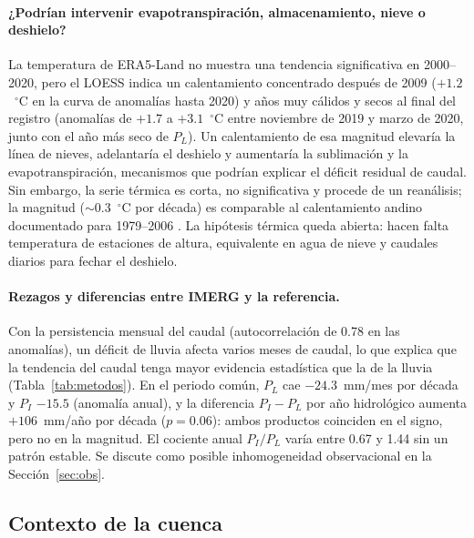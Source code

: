 \documentclass[11pt,letterpaper]{article}
\begin{document}
\paragraph{¿Podrían intervenir evapotranspiración, almacenamiento, nieve o deshielo?} La temperatura de
ERA5-Land no muestra una tendencia significativa en 2000--2020, pero el LOESS indica un calentamiento
concentrado después de 2009 ($+1.2$~$^\circ$C en la curva de anomalías hasta 2020) y años muy cálidos y secos al
final del registro (anomalías de $+1.7$ a $+3.1$~$^\circ$C entre noviembre de 2019 y marzo de 2020, junto con el año
más seco de $P_L$). Un calentamiento de esa magnitud elevaría la línea de nieves, adelantaría el deshielo y
aumentaría la sublimación y la evapotranspiración, mecanismos que podrían explicar el déficit residual de
caudal. Sin embargo, la serie térmica es corta, no significativa y procede de un reanálisis; la magnitud
($\sim$0.3~$^\circ$C por década) es comparable al calentamiento andino documentado para 1979--2006
\citep{Falvey2009}. La hipótesis térmica queda abierta: hacen falta temperatura de estaciones de altura,
equivalente en agua de nieve y caudales diarios para fechar el deshielo.

\paragraph{Rezagos y diferencias entre IMERG y la referencia.} Con la persistencia mensual del caudal
(autocorrelación de 0.78 en las anomalías), un déficit de lluvia afecta varios meses de caudal, lo que explica
que la tendencia del caudal tenga mayor evidencia estadística que la de la lluvia (Tabla~\ref{tab:metodos}).
En el periodo común, $P_L$ cae $-24.3$~mm/mes por década y $P_I$ $-15.5$ (anomalía anual), y la diferencia
$P_I-P_L$ por año hidrológico aumenta $+106$~mm/año por década ($p=0.06$): ambos productos coinciden en el signo,
pero no en la magnitud. El cociente anual $P_I/P_L$ varía entre 0.67 y 1.44 sin un patrón estable. Se discute
como posible inhomogeneidad observacional en la Sección~\ref{sec:obs}.

\subsection{Contexto de la cuenca}
\end{document}
